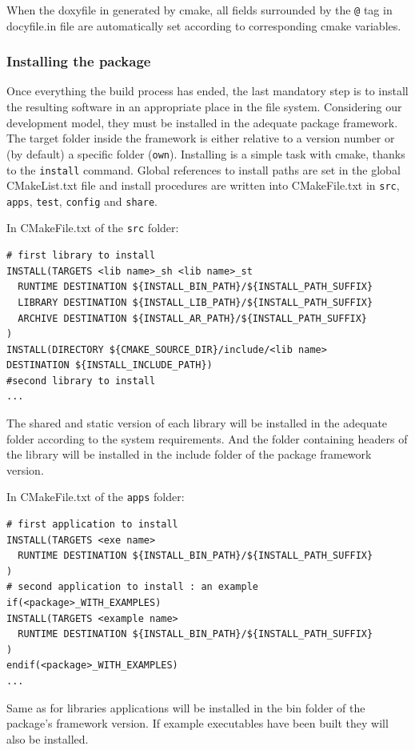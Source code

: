 \documentclass[12pt,a4paper]{article}
\begin{document}
When the doxyfile in generated by cmake, all fields surrounded by the \verb|@| tag in docyfile.in file are automatically set according to corresponding cmake variables.

\subsubsection{Installing the package}

Once everything the build process has ended, the last mandatory step is to install the resulting software in an appropriate place in the file system. Considering our development model, they must be installed in the adequate package framework. The target folder inside the framework is either relative to a version number or (by default) a specific folder (\verb|own|). Installing is a simple task with cmake, thanks to the \verb|install| command. Global references to install paths are set in the global CMakeList.txt file and install procedures are written into CMakeFile.txt in \texttt{src}, \texttt{apps}, \texttt{test}, \texttt{config} and \texttt{share}.

In CMakeFile.txt of the \texttt{src} folder:
\begin{verbatim}
# first library to install
INSTALL(TARGETS <lib name>_sh <lib name>_st 
  RUNTIME DESTINATION ${INSTALL_BIN_PATH}/${INSTALL_PATH_SUFFIX}
  LIBRARY DESTINATION ${INSTALL_LIB_PATH}/${INSTALL_PATH_SUFFIX}
  ARCHIVE DESTINATION ${INSTALL_AR_PATH}/${INSTALL_PATH_SUFFIX}
)
INSTALL(DIRECTORY ${CMAKE_SOURCE_DIR}/include/<lib name>
DESTINATION ${INSTALL_INCLUDE_PATH})
#second library to install
...
\end{verbatim}

The shared and static version of each library will be installed in the adequate folder according to the system requirements. And the folder containing headers of the library will be installed in the include folder of the package framework version.

In CMakeFile.txt of the \texttt{apps} folder:
\begin{verbatim}
# first application to install
INSTALL(TARGETS <exe name>
  RUNTIME DESTINATION ${INSTALL_BIN_PATH}/${INSTALL_PATH_SUFFIX}
)
# second application to install : an example
if(<package>_WITH_EXAMPLES)
INSTALL(TARGETS <example name>
  RUNTIME DESTINATION ${INSTALL_BIN_PATH}/${INSTALL_PATH_SUFFIX}
)
endif(<package>_WITH_EXAMPLES)
...
\end{verbatim}
Same as for libraries applications will be installed in the bin folder of the package's framework version. If example executables have been built they will also be installed.
\end{document}
